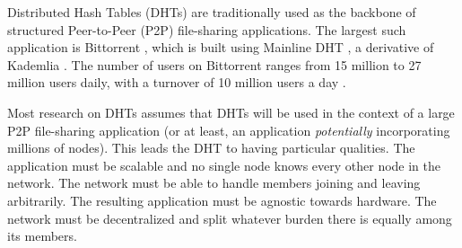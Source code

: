 Distributed Hash Tables (DHTs) are traditionally used as the backbone of structured Peer-to-Peer (P2P) file-sharing applications.
The largest such application is Bittorrent \cite{bittorrent}, which is built using Mainline DHT \cite{mainline},  a  derivative of Kademlia \cite{kademlia}.
The number of users on Bittorrent ranges from 15 million to 27 million users daily, with a turnover of 10 million users a day \cite{mainlineMeasure}.

Most research on DHTs assumes that DHTs will be used in the context of a large P2P file-sharing application (or at least, an application \textit{potentially} incorporating millions of nodes).
This leads the DHT to having particular qualities.
The application must be scalable and no single node knows every other node in the network.
The network must be able to handle members joining and leaving arbitrarily.
The resulting application must be agnostic towards hardware.
The network must be decentralized and split whatever burden there is equally among its members.








